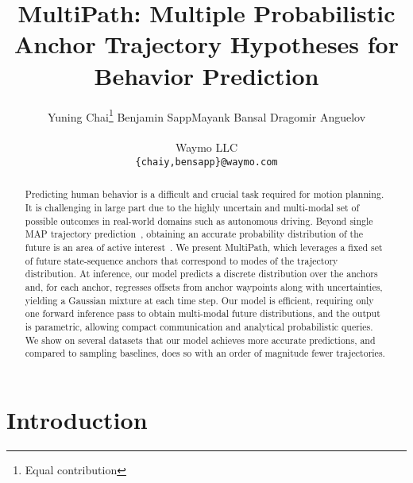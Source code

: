 \documentclass{article}
\title{MultiPath: Multiple Probabilistic Anchor Trajectory Hypotheses for Behavior Prediction}
\author{
  Yuning Chai\thanks{Equal contribution} \qquad Benjamin Sapp\samethanks \qquad Mayank Bansal \qquad Dragomir Anguelov \\
  \\
  Waymo LLC \\
  \texttt{\{chaiy,bensapp\}@waymo.com} \\
}
\newcommand{\out}[1]{}
\newcommand{\multiflow}{MultiPath\xspace}
\begin{document}
\maketitle

\begin{abstract}
Predicting human behavior is a difficult and crucial task required for motion planning.  It is challenging in large part due to the highly uncertain and multi-modal set of possible outcomes in real-world domains such as autonomous driving.  Beyond single MAP trajectory prediction~\cite{Luo18, Casas18}, obtaining an accurate probability distribution of the future is an area of active interest~\cite{Lee17,Rhinehart18}. We present \multiflow, which leverages a fixed set of future state-sequence anchors that correspond to modes of the trajectory distribution.  At inference, our model predicts a  discrete distribution over the anchors and, for each anchor, regresses offsets from anchor waypoints along with uncertainties, yielding a Gaussian mixture at each time step. Our model is efficient, requiring only one forward inference pass to obtain multi-modal future distributions, and the output is parametric, allowing compact communication and analytical probabilistic queries. We show on several datasets that our model achieves more accurate predictions, and compared to sampling baselines, does so with an order of magnitude fewer trajectories.
 
 \out{Recent approaches either predict single trajectories~\cite{Luo18,Casas18}, or use a generative model to obtain multiple trajectory samples~\cite{Lee17,Rhinehart18}.  While flexible, sample-generating models have several issues: trajectory sample likelihoods are unknown, it is not obvious how many samples are sufficient to guarantee that important safety-critical modes are covered and finally, the quality of generated samples can be suboptimal in highly multi-modal real-world situations. 

In contrast, we present \multiflow, which leverages a fixed set of future state-sequence anchors that correspond to modes of the trajectory distribution.  At inference, our model predicts a  distribution over the anchors and regresses trajectories and associated uncertainties within each mode, yielding a Gaussian mixture at each time step. Our model is efficient, requiring only one forward inference pass to obtain multi-modal future distributions, and the output is parametric, allowing compact communication and analytical probabilistic queries. We show on several datasets that our model achieves more accurate predictions, and compared to sampling baselines, does so with an order of magnitude fewer trajectories.
}

\end{abstract} \section{Introduction}
\label{sec:intro}
\end{document}
